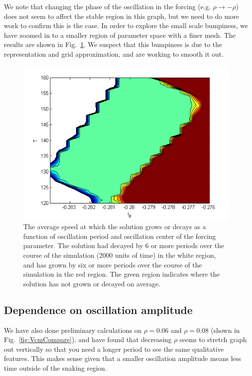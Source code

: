 \documentclass[pre,preprint,superscriptaddress]{revtex4-1}
\begin{document}
We note that changing the phase of the oscillation in the forcing (e.g. $\rho\rightarrow-\rho$) does not seem to affect the stable region in this graph, but we need to do more work to confirm this is the case.  In order to explore the small scale bumpiness, we have zoomed in to a smaller region of parameter space with a finer mesh.  The results are shown in Fig.~\ref{fig:Vcm01zoom}.  We suspect that this bumpiness is due to the representation and grid approximation, and are working to smooth it out.
\begin{figure}[!htb]\center
\includegraphics[width=120mm]{Vcm01zoom.png}
\caption{The average speed at which the solution grows or decays as a function of oscillation period and oscillation center of the forcing parameter.  The solution had decayed by 6 or more periods over the course of the simulation (2000 units of time) in the white region, and has grown by six or more periods over the course of the simulation  in the red region.  The green region indicates where the solution has not grown or decayed on average.}
    \label{fig:Vcm01zoom}
\end{figure}



\subsection{Dependence on oscillation amplitude}
We have also done  preliminary calculations on $\rho =0.06$ and $\rho =0.08$ (shown in Fig.~\ref{fig:VcmCompare}), and have found that decreasing $\rho$ seems to stretch graph out vertically so that you need a longer period to see the same qualitative features.  This makes sense given that a smaller oscillation amplitude means less time outside of the snaking region.   
\end{document}
